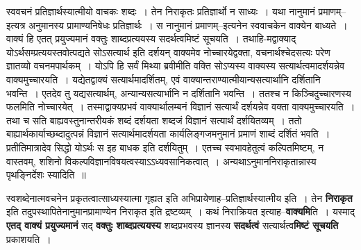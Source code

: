 \documentclass[article,12pt,a4paper]{memoir}
\begin{document}
	स्ववचनं प्रतिज्ञार्थस्यात्मीयो वाचकः शब्दः । तेन निराकृतः प्रतिज्ञार्थो न साध्यः । यथा नानुमानं प्रमाणम्--इत्यत्र अनुमानस्य प्रामाण्यनिषेधः प्रतिज्ञार्थः । स नानुमानं प्रमाणम्--इत्यनेन स्ववाचकेन वाक्येन बाध्यते । वाक्यं हि एतत् प्रयुज्यमानं वक्तुः शाब्दप्रत्ययस्य सदर्थत्वमिष्टं सूचयति । तथाहि-मद्वाक्याद् योऽर्थसम्प्रत्ययस्तवोत्पद्यते सोऽसत्यार्थ इति दर्शयन् वाक्यमेव नोच्चारयेद्वक्ता, वचनार्थश्चेदसत्यः परेण ज्ञातव्यो वचनमपार्थकम् । योऽपि हि सर्वं मिथ्या ब्रवीमीति वक्ति सोऽप्यस्य वाक्यस्य सत्यार्थत्वमादर्शयन्नेव वाक्यमुच्चारयति । यद्येतद्वाक्यं सत्यार्थमादर्शितम्, एवं वाक्यान्तराण्यात्मीयान्यसत्यार्थानि दर्शितानि भवन्ति । एतदेव तु यद्यसत्यार्थम्, अन्यान्यसत्यार्भानि न दर्शितानि भवन्ति । ततश्च न किञ्चिदुच्चारणस्य फलमिति नोच्चारयेत् । तस्माद्वाक्यप्रभवं वाक्यार्थालम्बनं विज्ञानं सत्यार्थं दर्शयन्नेव वक्ता वाक्यमुच्चारयति । तथा च सति बाह्यवस्तुनान्तरीयकं शब्दं दर्शयता शब्दजं विज्ञानं सत्यार्थं दर्शयितव्यम् । ततो बाह्यार्थकार्याच्छब्दादुत्पन्नं विज्ञानं सत्यार्थमादर्शयता कार्यलिङ्गजमनुमानं प्रमाणं शाब्दं दर्शितं भवति । प्रतीतिमात्रादेव सिद्धो योऽर्थः स इह बाधक इति दर्शयितुम् । एतच्च स्वभावहेतुत्वं कल्पितमिष्टम्, न वास्तवम्, शशिनो विकल्पविज्ञानविषयत्वस्याऽऽध्यवसानिकत्वात् । अन्यथाऽनुमाननिराकृतान्नास्य पृथङ्निर्देशः स्यादिति ॥
	\pend
      

	  \pstart स्वशब्देनात्मवचनेन प्रकृतत्वात्साध्यस्यात्मा गृह्यत इति अभिप्रायेणाह--प्रतिज्ञार्थस्यात्मीय इति । तेन \textbf{निराकृत} इति तदुपस्थापितेनानुमानप्रामाण्येन निराकृत इति द्रष्टव्यम् । कथं निराक्रियत इत्याह--\textbf{वाक्यमि}ति । यस्माद् \textbf{एतद् वाक्यं प्रयुज्यमानं} सद् \textbf{वक्तुः शाब्दप्रत्ययस्य} शब्दप्रभवस्य ज्ञानस्य \textbf{सदर्थत्वं} सत्यार्थत्व\textbf{मिष्टं सूचयति} प्रकाशयति ।
	\pend
      
\end{document}
